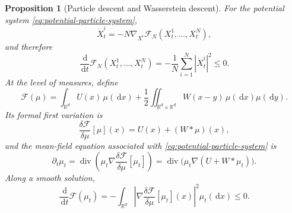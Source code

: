 \documentclass[11pt]{amsart}
\numberwithin{equation}{section}
\theoremstyle{plain}
\newtheorem{proposition}[theorem]{Proposition}
\newcommand{\R}{\mathbb{R}}
\newcommand{\dd}{\,\mathrm{d}}
\newcommand{\abs}[1]{\left\lvert#1\right\rvert}
\DeclareMathOperator{\diver}{div}
\begin{document}
\begin{proposition}[Particle descent and Wasserstein descent]
\label{prop:ips-wasserstein-gradient-flow}
For the potential system \eqref{eq:potential-particle-system},
\begin{equation}\label{eq:particle-gradient-flow}
 \dot X_t^i=-N\nabla_{X^i}\mathcal F_N(X_t^1,\ldots,X_t^N),
\end{equation}
and therefore
\begin{equation}\label{eq:particle-energy-dissipation}
 \frac{\dd}{\dd t}\mathcal F_N(X_t^1,\ldots,X_t^N)
 =-\frac1N\sum_{i=1}^N\abs{\dot X_t^i}^2\leq0.
\end{equation}
At the level of measures, define
\begin{equation}\label{eq:interaction-energy}
 \mathcal F(\mu)
 =\int_{\R^d}U(x)\,\mu(\dd x)
 +\frac12\iint_{\R^d\times\R^d}
 W(x-y)\,\mu(\dd x)\mu(\dd y).
\end{equation}
Its formal first variation is
\begin{equation}\label{eq:interaction-first-variation}
 \frac{\delta\mathcal F}{\delta\mu}[\mu](x)
 =U(x)+(W*\mu)(x),
\end{equation}
and the mean-field equation associated with
\eqref{eq:potential-particle-system} is
\begin{equation}\label{eq:wasserstein-interaction-gf}
 \partial_t\mu_t
 =\diver\left(\mu_t\nabla
     \frac{\delta\mathcal F}{\delta\mu}[\mu_t]\right)
 =\diver\bigl(\mu_t\nabla(U+W*\mu_t)\bigr).
\end{equation}
Along a smooth solution,
\begin{equation}\label{eq:energy-dissipation}
 \frac{\dd}{\dd t}\mathcal F(\mu_t)
 =-\int_{\R^d}
 \left|\nabla\frac{\delta\mathcal F}{\delta\mu}[\mu_t](x)\right|^2
 \mu_t(\dd x)\leq0.
\end{equation}
\end{proposition}
\end{document}
